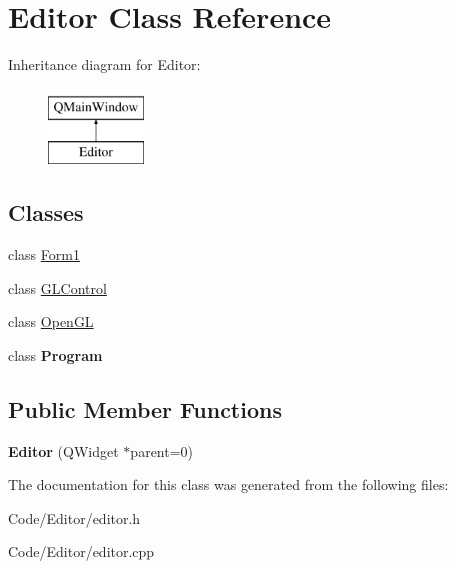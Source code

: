 \hypertarget{class_editor}{}\section{Editor Class Reference}
\label{class_editor}
Inheritance diagram for Editor\+:\begin{figure}[H]
\begin{center}
\leavevmode
\includegraphics[height=2.000000cm]{class_editor}
\end{center}
\end{figure}
\subsection*{Classes}
\begin{DoxyCompactItemize}
\item 
class \hyperlink{class_editor_1_1_form1}{Form1}
\item 
class \hyperlink{class_editor_1_1_g_l_control}{G\+L\+Control}
\item 
class \hyperlink{class_editor_1_1_open_g_l}{Open\+GL}
\item 
class {\bfseries Program}
\end{DoxyCompactItemize}
\subsection*{Public Member Functions}
\begin{DoxyCompactItemize}
\item 
{\bfseries Editor} (Q\+Widget $\ast$parent=0)\hypertarget{class_editor_a2918aceeffbc123a96e201b0934b9b16}{}\label{class_editor_a2918aceeffbc123a96e201b0934b9b16}

\end{DoxyCompactItemize}


The documentation for this class was generated from the following files\+:\begin{DoxyCompactItemize}
\item 
Code/\+Editor/editor.\+h\item 
Code/\+Editor/editor.\+cpp\end{DoxyCompactItemize}
